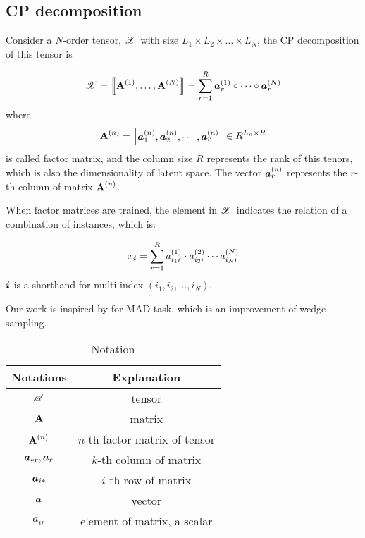\documentclass[letterpaper]{article}
\newcommand{\Sca}[3]{{#1}^{(#2)}_{i_#2#3}}%
\newcommand{\T}[1]{\boldsymbol{\mathscr{\MakeUppercase{#1}}}}
\newcommand{\KT}[1]{\left\llbracket #1 \right\rrbracket}
\newcommand{\V}[1]{{\bm{{\MakeLowercase{#1}}}}}
\newcommand{\VnC}[3]{\V{#1}^{(#2)}_{#3}}
\newcommand{\M}[1]{{\bm{\mathbf{\MakeUppercase{#1}}}}}
\newcommand{\Mn}[2]{\M{#1}^{(#2)}}
\newcommand{\Coord}{(i_1,i_2,\ldots,i_N)}
\begin{document}
\subsection{CP decomposition}

Consider a $N$-order tensor, $\T{X}$ with size $L_1\times L_2\times\ldots\times L_N$,
the CP decomposition\cite{KoBa09} of this tensor is

\begin{equation}\label{eq:CPDecomposition}
\T{X}= \KT{ \Mn{A}{1},\dots,\Mn{A}{N}} =
\sum_{r=1}^{R}\VnC{A}{1}{r} \circ \cdots \circ \VnC{A}{N}{r}
\end{equation}
where
\[
    \M{A}^{(n)} =
    \begin{bmatrix}
        \VnC{a}{n}{1},\VnC{a}{n}{2},\cdots,\VnC{a}{n}{r}
    \end{bmatrix}  \in R^{L_n\times R}
\]
is called factor matrix, and the column size $R$ represents the rank of this tenors,
which is also the dimensionality of latent space.
The vector $\VnC{a}{n}{r}$ represents the $r$-th column of matrix $\Mn{A}{n}$.

When factor matrices are trained, 
the element in $\T{X}$ indicates the relation of a combination of instances, which is:

\begin{equation}\label{eq:ValueInTensor}
x_\V{i} = \sum_{r=1}^{R}\Sca{a}{1}{r}\cdot\Sca{a}{2}{r}\cdots\Sca{a}{N}{r}
\end{equation}
$\V{i}$ is a shorthand for multi-index $\Coord$.

Our work is inspired by \cite{BaPiKoSe15} for MAD task,
which is an improvement of wedge sampling\cite{Cohen97}.

\begin{table}[t]
  \label{table:Notation}
  \centering
  \begin{tabular}{|c|c|}
    \hline
    Notations & Explanation \\
    \hline
    $\T{A}$ & tensor \\
    $\M{A}$ & matrix \\
    $\Mn{A}{n}$ & $n$-th factor matrix of tensor\\
    $\V{A}_{*r},\V{A}_r$ & $k$-th column of matrix \\
    $\V{A}_{i*}$ & $i$-th row of matrix \\
    $\V{A}$ & vector \\
    $a_{ir}$ & element of matrix, a scalar\\
    \hline
  \end{tabular}
  \caption{Notation}
\end{table}
\end{document}
